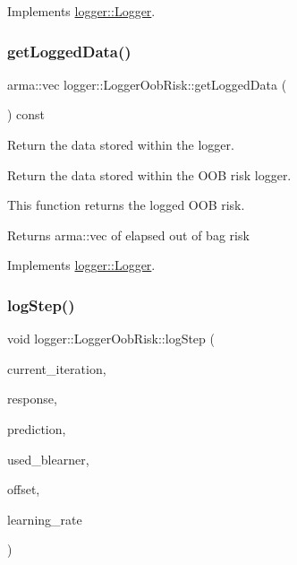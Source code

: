 Implements \hyperlink{classlogger_1_1_logger_a8c68db2430fa84b67528bfa6ae45a516}{logger\+::\+Logger}.

\mbox{\label{classlogger_1_1_logger_oob_risk_a1529f62cf58ad8bc5922a7d39ed3515e}} 
\subsubsection{\texorpdfstring{get\+Logged\+Data()}{getLoggedData()}}
{\footnotesize\ttfamily arma\+::vec logger\+::\+Logger\+Oob\+Risk\+::get\+Logged\+Data (\begin{DoxyParamCaption}{ }\end{DoxyParamCaption}) const\hspace{0.3cm}{\ttfamily [virtual]}}



Return the data stored within the logger. 

Return the data stored within the O\+OB risk logger.

This function returns the logged O\+OB risk.

\begin{DoxyReturn}{Returns}
{\ttfamily arma\+::vec} of elapsed out of bag risk 
\end{DoxyReturn}


Implements \hyperlink{classlogger_1_1_logger_aa4fc254c532172db3404b7c0bcd17092}{logger\+::\+Logger}.

\mbox{\label{classlogger_1_1_logger_oob_risk_a4b0ea670a7970bca31037efab99cc06a}} 
\subsubsection{\texorpdfstring{log\+Step()}{logStep()}}
{\footnotesize\ttfamily void logger\+::\+Logger\+Oob\+Risk\+::log\+Step (\begin{DoxyParamCaption}\item[{const unsigned int \&}]{current\+\_\+iteration,  }\item[{const arma\+::vec \&}]{response,  }\item[{const arma\+::vec \&}]{prediction,  }\item[{\hyperlink{classblearner_1_1_baselearner}{blearner\+::\+Baselearner} $\ast$}]{used\+\_\+blearner,  }\item[{const double \&}]{offset,  }\item[{const double \&}]{learning\+\_\+rate }\end{DoxyParamCaption})\hspace{0.3cm}{\ttfamily [virtual]}}



